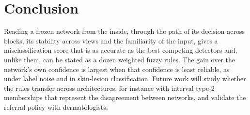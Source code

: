 \section{Conclusion}
Reading a frozen network from the inside, through the path of its decision across blocks, its stability across views and the familiarity
of the input, gives a misclassification score that is as accurate as the best competing detectors and, unlike them, can be stated as a
dozen weighted fuzzy rules. The gain over the network's own confidence is largest when that confidence is least reliable, as under label
noise and in skin-lesion classification. Future work will study whether the rules transfer across architectures, for instance with
interval type-2 memberships that represent the disagreement between networks, and validate the referral policy with dermatologists.






